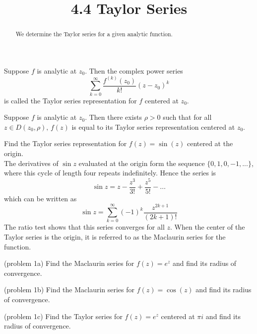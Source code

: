 \documentclass[handout]{ximera}
\title{4.4 Taylor Series}
\begin{document}
\begin{abstract}
We determine the Taylor series for a given analytic function.
\end{abstract}

\maketitle


\begin{definition} 
Suppose $f$ is analytic at $z_0$. Then the complex power series
\[
\sum_{k=0}^\infty \frac{f^{(k)}(z_0)}{k!}(z-z_0)^k
\]
is called the Taylor series representation for $f$ centered at $z_0$.
\end{definition}

\begin{theorem}
Suppose $f$ is analytic at $z_0$. Then there exists $\rho >0$ such that for all $z \in D(z_0, \rho), \,f(z)$ is equal to its Taylor series representation centered at $z_0$.
\end{theorem}

\begin{example}[example 1]
Find the Taylor series representation for $f(z) = \sin(z)$ centered at the origin.\\
The derivatives of $\sin z$ evaluated at the origin form the sequence $\{0, 1, 0, -1,...\}$,
where this cycle of length four repeats indefinitely.
Hence the series is 
\[
\sin z = z - \frac{z^3}{3!} + \frac{z^5}{5!} - \dots
\]
which can be written as
\[
\sin z = \sum_{k=0}^\infty (-1)^k \frac{z^{2k+1}}{(2k+1)!}
\]
The ratio test shows that this series converges for all $z$.
When the center of the Taylor series is the origin, it is referred to as the Maclaurin series for the function.
\end{example}

\begin{problem}(problem 1a)
Find the Maclaurin series for $f(z) = e^z$ and find its radius of convergence.
\end{problem}

\begin{problem}(problem 1b)
Find the Maclaurin series for $f(z) = \cos(z)$ and find its radius of convergence.
\end{problem}

\begin{problem}(problem 1c)
Find the Taylor series for $f(z) = e^z$ centered at $\pi i$ and find its radius of convergence.
\end{problem}
\end{document}
